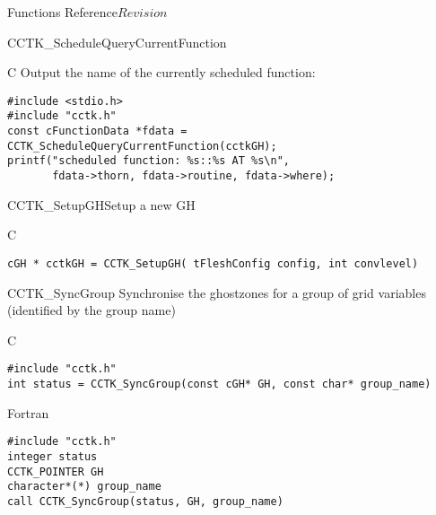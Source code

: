 \begin{cactuspart}{ Functions Reference}{}{$Revision$}
\begin{FunctionDescription}{CCTK\_ScheduleQueryCurrentFunction}
  \begin{ExampleSection}
    \begin{Example}{C}
      Output the name of the currently scheduled function:
\begin{verbatim}
#include <stdio.h>
#include "cctk.h"
const cFunctionData *fdata = CCTK_ScheduleQueryCurrentFunction(cctkGH);
printf("scheduled function: %s::%s AT %s\n",
       fdata->thorn, fdata->routine, fdata->where);
\end{verbatim}
\end{Example}
  \end{ExampleSection}
  
\end{FunctionDescription}




\begin{FunctionDescription}{CCTK\_SetupGH}{Setup a new GH}
\label{CCTK-SetupGH}
\begin{SynopsisSection}
\begin{Synopsis}{C}
\begin{verbatim}cGH * cctkGH = CCTK_SetupGH( tFleshConfig config, int convlevel)\end{verbatim}
\end{Synopsis}
\end{SynopsisSection}
\end{FunctionDescription}




\begin{FunctionDescription}{CCTK\_SyncGroup}
\label{CCTK-SyncGroup}
Synchronise the ghostzones for a group of grid variables
(identified by the group name)

\begin{SynopsisSection}
\begin{Synopsis}{C}
\begin{verbatim}
#include "cctk.h"
int status = CCTK_SyncGroup(const cGH* GH, const char* group_name)
\end{verbatim}
\end{Synopsis}
\begin{Synopsis}{Fortran}
\begin{verbatim}
#include "cctk.h"
integer status
CCTK_POINTER GH
character*(*) group_name
call CCTK_SyncGroup(status, GH, group_name)
\end{verbatim}
\end{Synopsis}
\end{SynopsisSection}


\end{FunctionDescription}
\end{cactuspart}
